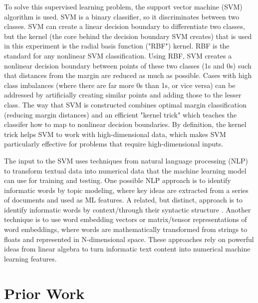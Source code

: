 \documentclass[10pt,twocolumn]{article}
\begin{document}
To solve this supervised learning problem, the support vector machine (SVM) algorithm is used. SVM is a binary classifier, so it discriminates between two classes. SVM can create a linear decision boundary to differentiate two classes, but the kernel (the core behind the decision boundary SVM creates) that is used in this experiment is the radial basis function ("RBF") kernel. RBF is the standard for any nonlinear SVM classification. Using RBF, SVM creates a nonlinear decision boundary between points of these two classes (1s and 0s) such that distances from the margin are reduced as much as possible. \cite{CortesVapnikSVM} Cases with high class imbalances (where there are far more 0s than 1s, or vice versa) can be addressed by artificially creating similar points and adding those to the lesser class. \cite{NVChawla} The way that SVM is constructed combines optimal margin classification (reducing margin distances) and an efficient "kernel trick" which teaches the classifer how to map to nonlinear decision boundaries. By definition, the kernel trick helps SVM to work with high-dimensional data, which makes SVM particularly effective for problems that require high-dimensional inputs. \cite{Joachims, Berbatova} 

The input to the SVM uses techniques from natural language processing (NLP) to transform textual data into numerical data that the machine learning model can use for training and testing. One possible NLP approach is to identify informatic words by topic modeling, where key ideas are extracted from a series of documents and used as ML features. \cite{Ryan_51, Reuver} A related, but distinct, approach is to identify informatic words by context/through their syntactic structure \cite{Meidl, LDiCaro}. Another technique is to use word embedding vectors or matrix/tensor representations of word embeddings, where words are mathematically transformed from strings to floats and represented in N-dimensional space. \cite{Sifa_tensor} These approaches rely on powerful ideas from linear algebra to turn informatic text content into numerical machine learning features.

\section{Prior Work}

\end{document}
